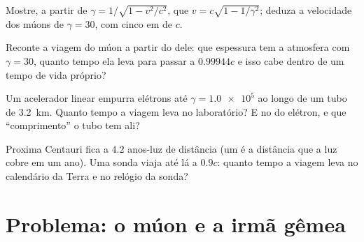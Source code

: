 \begin{exercise}[$\star\star\star$]\label{exo:g12:special-relativity:12}
Mostre, a partir de $\gamma = 1/\sqrt{1 - v^2/c^2}$, que
$v = c\sqrt{1 - 1/\gamma^2}$; deduza a velocidade dos múons de $\gamma = 30$, com cinco
 em  de $c$.
\end{exercise}

\begin{exercise}[$\star\star\star$]\label{exo:g12:special-relativity:13}
Reconte a viagem do múon a partir do  dele: que espessura tem a atmosfera com
$\gamma = 30$, quanto tempo ela leva para passar a $0.99944c$ e isso cabe dentro de um
tempo de vida próprio?
\end{exercise}

\begin{exercise}[$\star\star\star$]\label{exo:g12:special-relativity:14}
Um acelerador linear empurra elétrons até $\gamma = \num{1.0e5}$ ao longo de um tubo de
\qty{3.2}{km}. Quanto tempo a viagem leva no laboratório? E no  do elétron, e
que ``comprimento'' o tubo tem ali?
\end{exercise}

\begin{exercise}[$\star\star\star$]\label{exo:g12:special-relativity:15}
Proxima Centauri fica a $4.2$ anos-luz de distância (um  é a distância que a luz
cobre em um ano). Uma sonda viaja até lá a $0.9c$: quanto tempo a viagem leva no
calendário da Terra e no relógio da sonda?
\end{exercise}

\section{Problema: o múon e a irmã gêmea}

